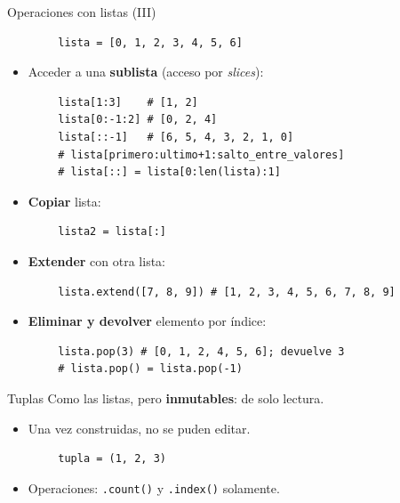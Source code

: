 \documentclass[10pt]{beamer} %
\begin{document}
\begin{frame}[fragile]{Operaciones con listas (III)}
    \begin{verbatim}
        lista = [0, 1, 2, 3, 4, 5, 6]
    \end{verbatim}
    \begin{itemize}
        \item Acceder a una \textbf{sublista} (acceso por \textit{slices}):
    \end{itemize}
    \begin{verbatim}
        lista[1:3]    # [1, 2]
        lista[0:-1:2] # [0, 2, 4]
        lista[::-1]   # [6, 5, 4, 3, 2, 1, 0]
        # lista[primero:ultimo+1:salto_entre_valores]
        # lista[::] = lista[0:len(lista):1]
    \end{verbatim}
    \begin{itemize}
        \item \textbf{Copiar} lista:
    \end{itemize}
    \begin{verbatim}
        lista2 = lista[:]
    \end{verbatim}
    \begin{itemize}
        \item \textbf{Extender} con otra lista:
    \end{itemize}
    \begin{verbatim}
        lista.extend([7, 8, 9]) # [1, 2, 3, 4, 5, 6, 7, 8, 9]
    \end{verbatim}
    \begin{itemize}
        \item \textbf{Eliminar y devolver} elemento por índice:
    \end{itemize}
    \begin{verbatim}
        lista.pop(3) # [0, 1, 2, 4, 5, 6]; devuelve 3
        # lista.pop() = lista.pop(-1)
    \end{verbatim}
\end{frame}

\begin{frame}[fragile]{Tuplas}
    Como las listas, pero \textbf{inmutables}: de solo lectura.
    \begin{itemize}
        \item Una vez construidas, no se puden editar.
    \end{itemize}
    \begin{verbatim}
        tupla = (1, 2, 3)
    \end{verbatim}
    \begin{itemize}
        \item Operaciones: \texttt{.count()} y \texttt{.index()} solamente.
    \end{itemize}
\end{frame}
\end{document}
